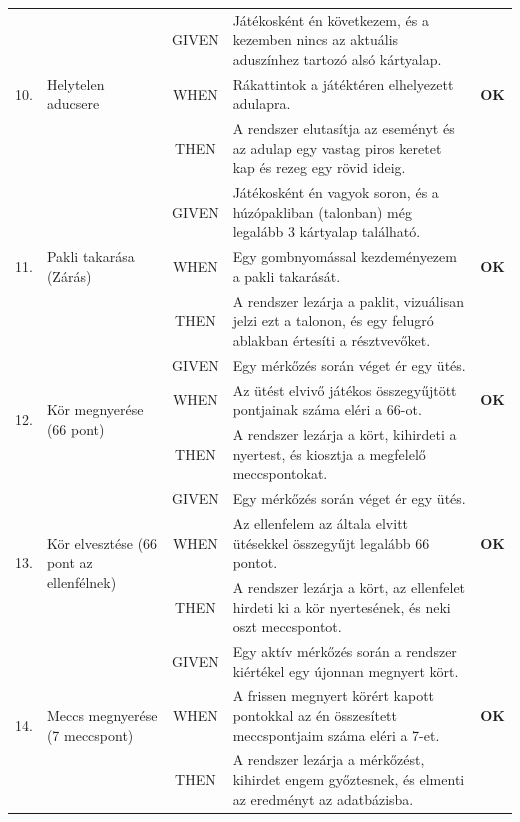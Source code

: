 \begin{longtable}{| c | m{3cm} | c | m{6cm} | c |}
    \multirow{3}{*}{10.} & \multirow{3}{3cm}{Helytelen aducsere} 
    & GIVEN & Játékosként én következem, és a kezemben nincs az aktuális aduszínhez tartozó alsó kártyalap. & \cellcolor{green!40} \\* \cline{3-4}
    & & WHEN & Rákattintok a játéktéren elhelyezett adulapra. & \cellcolor{green!40}\textbf{OK} \\* \cline{3-4}
    & & THEN & A rendszer elutasítja az eseményt és az adulap egy vastag piros keretet kap és rezeg egy rövid ideig. & \cellcolor{green!40} \\ \hline

    \multirow{3}{*}{11.} & \multirow{3}{3cm}{Pakli takarása (Zárás)} 
    & GIVEN & Játékosként én vagyok soron, és a húzópakliban (talonban) még legalább 3 kártyalap található. & \cellcolor{green!40} \\* \cline{3-4}
    & & WHEN & Egy gombnyomással kezdeményezem a pakli takarását. & \cellcolor{green!40}\textbf{OK} \\* \cline{3-4}
    & & THEN & A rendszer lezárja a paklit, vizuálisan jelzi ezt a talonon, és egy felugró ablakban értesíti a résztvevőket. & \cellcolor{green!40} \\ \hline

    \multirow{3}{*}{12.} & \multirow{3}{3cm}{Kör megnyerése (66 pont)} 
    & GIVEN & Egy mérkőzés során véget ér egy ütés. & \cellcolor{green!40} \\* \cline{3-4}
    & & WHEN & Az ütést elvivő játékos összegyűjtött pontjainak száma eléri a 66-ot. & \cellcolor{green!40}\textbf{OK} \\* \cline{3-4}
    & & THEN & A rendszer lezárja a kört, kihirdeti a nyertest, és kiosztja a megfelelő meccspontokat. & \cellcolor{green!40} \\ \hline

    \multirow{3}{*}{13.} & \multirow{3}{3cm}{Kör elvesztése (66 pont az ellenfélnek)} 
    & GIVEN & Egy mérkőzés során véget ér egy ütés. & \cellcolor{green!40} \\* \cline{3-4}
    & & WHEN & Az ellenfelem az általa elvitt ütésekkel összegyűjt legalább 66 pontot. & \cellcolor{green!40}\textbf{OK} \\* \cline{3-4}
    & & THEN & A rendszer lezárja a kört, az ellenfelet hirdeti ki a kör nyertesének, és neki oszt meccspontot. & \cellcolor{green!40} \\ \hline

    \multirow{3}{*}{14.} & \multirow{3}{3cm}{Meccs megnyerése (7 meccspont)} 
    & GIVEN & Egy aktív mérkőzés során a rendszer kiértékel egy újonnan megnyert kört. & \cellcolor{green!40} \\* \cline{3-4}
    & & WHEN & A frissen megnyert körért kapott pontokkal az én összesített meccspontjaim száma eléri a 7-et. & \cellcolor{green!40}\textbf{OK} \\* \cline{3-4}
    & & THEN & A rendszer lezárja a mérkőzést, kihirdet engem győztesnek, és elmenti az eredményt az adatbázisba. & \cellcolor{green!40} \\ \hline


\end{longtable}
